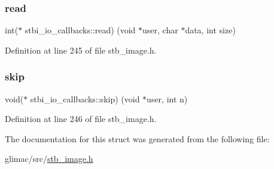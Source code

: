 \mbox{\label{structstbi__io__callbacks_a623e46b3a2a019611601409926283a88}} 
\subsubsection{\texorpdfstring{read}{read}}
{\footnotesize\ttfamily int($\ast$ stbi\+\_\+io\+\_\+callbacks\+::read) (void $\ast$user, char $\ast$data, int size)}



Definition at line 245 of file stb\+\_\+image.\+h.

\mbox{\label{structstbi__io__callbacks_a257aac5480a90a6c4b8fbe86c1b01068}} 
\subsubsection{\texorpdfstring{skip}{skip}}
{\footnotesize\ttfamily void($\ast$ stbi\+\_\+io\+\_\+callbacks\+::skip) (void $\ast$user, int n)}



Definition at line 246 of file stb\+\_\+image.\+h.



The documentation for this struct was generated from the following file\+:\begin{DoxyCompactItemize}
\item 
glimac/src/\hyperlink{stb__image_8h}{stb\+\_\+image.\+h}\end{DoxyCompactItemize}
